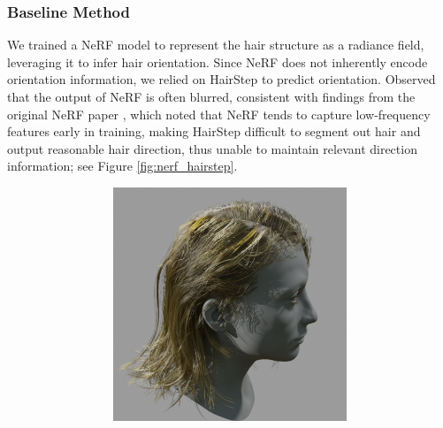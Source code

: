 \documentclass[12pt]{article}
\begin{document}
\subsubsection{Baseline Method}
We trained a NeRF model to represent the hair structure as a radiance field, leveraging it to infer hair orientation. Since NeRF does not inherently encode orientation information, we relied on HairStep to predict orientation. Observed that the output of NeRF is often blurred, consistent with findings from the original NeRF paper \cite{mildenhall_nerf_2020}, which noted that NeRF tends to capture low-frequency features early in training, making HairStep difficult to segment out hair and output reasonable hair direction, thus unable to maintain relevant direction information; see Figure \ref{fig:nerf_hairstep}.
\begin{figure}[h]
    \centering
    \begin{subfigure}{0.48\textwidth}
        \centering
        \begin{subfigure}{0.48\textwidth}
            \centering
            \includegraphics[width=\textwidth]{./images/test_6_rendered.png}
        \end{subfigure}
        \hfill
        \begin{subfigure}{0.48\textwidth}
            \centering

\end{subfigure}
\end{subfigure}
\end{figure}
\end{document}
